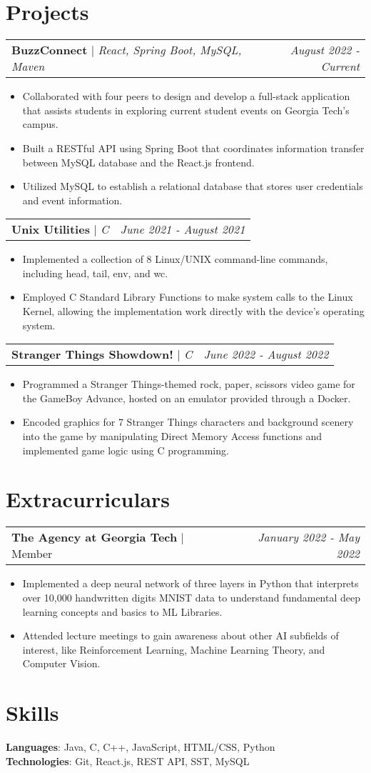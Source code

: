 \documentclass[letterpaper,11pt]{article}
\makeatletter
\newcommand{\resumeExperienceHeading}[3]{
    \begin{tabular*}{0.99\textwidth}[t]{l@{\extracolsep{\fill}}r}
      \textbf{#1} $\vert$ {#2} & \textit{#3} \\
    \end{tabular*}\vspace{-3pt}
}
\newcommand{\resumeProjectHeading}[3]{
    \begin{tabular*}{0.97\textwidth}[t]{l@{\extracolsep{\fill}}r}
      \textbf{#1} $\vert$ \textit{#2}  & \textit{#3}
    \end{tabular*}\vspace{-3pt}
}
\newcommand{\resumeItemListStart}{\begin{itemize}[noitemsep]\vspace{-4pt}}
\newcommand{\resumeItemListEnd}{\end{itemize}}
\makeatother
\begin{document}
\section{Projects}
    \resumeProjectHeading{BuzzConnect}{React, Spring Boot, MySQL, Maven}{August 2022 - Current}
      \resumeItemListStart
        \item {Collaborated with four peers to design and develop a full-stack application that assists students in exploring current student events on Georgia Tech's campus.}
        \item {Built a RESTful API using Spring Boot that coordinates information transfer between MySQL database and the React.js frontend.}
        \item {Utilized MySQL to establish a relational database that stores user credentials and event information.}
      \resumeItemListEnd

    \resumeProjectHeading{Unix Utilities}{C}{June 2021 - August 2021}
      \resumeItemListStart
        \item {Implemented a collection of 8 Linux/UNIX command-line commands, including head, tail, env, and wc.}
        \item {Employed C Standard Library Functions to make system calls to the Linux Kernel, allowing the implementation work directly with the device's operating system.}
      \resumeItemListEnd

    \resumeProjectHeading{Stranger Things Showdown!}{C}{June 2022 - August 2022}
      \resumeItemListStart
        \item {Programmed a Stranger Things-themed rock, paper, scissors video game for the GameBoy Advance, hosted on an emulator provided through a Docker.}
        \item {Encoded graphics for 7 Stranger Things characters and background scenery into the game by manipulating Direct Memory Access functions and implemented game logic using C programming.}
      \resumeItemListEnd

\section{Extracurriculars}
  \resumeExperienceHeading{The Agency at Georgia Tech}{Member}{January 2022 - May 2022}
    \resumeItemListStart
      \item {Implemented a deep neural network of three layers in Python that interprets over 10,000 handwritten
      digits MNIST data to understand fundamental deep learning concepts and basics to ML Libraries.}
      \item {Attended lecture meetings to gain awareness about other AI subfields of interest, like Reinforcement
      Learning, Machine Learning Theory, and Computer Vision.}
    \resumeItemListEnd
  
\section{Skills}
    \textbf{Languages}{: Java, C, C++, JavaScript, HTML/CSS, Python} \\
    \textbf{Technologies}{: Git, React.js, REST API, SST, MySQL}
\end{document}
